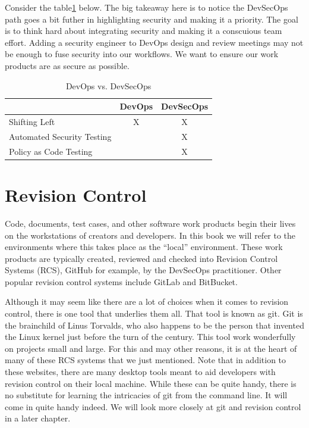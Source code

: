 \justify{}
Consider the table\ref{DevOps vs. DevSecOps} below. The big takeaway here is to notice the DevSecOps path goes a bit futher
in highlighting security and making it a priority. The goal is to think hard about integrating
security and making it a conscuious team effort. Adding a security engineer to DevOps design 
and review meetings may not be enough to fuse security into our workflows. We want to ensure
our work products are as secure as possible.

\begin{table}[ht]
    \centering
    \begin{tabular}{|l|c|c|}\hline
                                   & DevOps & DevSecOps \\\hline
        Shifting Left              &   X    &    X       \\\hline
        Automated Security Testing &        &    X       \\\hline
        Policy as Code Testing     &        &    X       \\\hline

    \end{tabular}
\caption{DevOps vs. DevSecOps}
\label{DevOps vs. DevSecOps}
\end{table}

\section{Revision Control}

\justify{}
Code, documents, test cases, and other software work products begin their lives on the workstations of creators
and developers. In this book we will refer to the environments where this takes place as the ``local'' environment.
These work products are typically created, reviewed and checked into Revision Control Systems 
(RCS), GitHub for example, by the DevSecOps practitioner. 
Other popular revision control systems include GitLab and BitBucket.

\justify{}
Although it may seem like there are a lot of choices when it comes to revision control, there
is one tool that
underlies them all. That tool is known as git. Git is the brainchild of Linus Torvalds, who also
happens to be
the person that invented the Linux kernel just before the turn of the century. This tool work wonderfully
on projects small
and large. For this and may other reasons, it is at the heart of many of these RCS systems that we just mentioned. Note that
in addition to these websites, there are many desktop tools meant to aid developers with revision control on their local
machine. While these can be quite handy, there is no substitute for learning the intricacies of git from the command
line. It will come in quite handy indeed.
\justify{}
We will look more closely at git and revision control in a later chapter.

